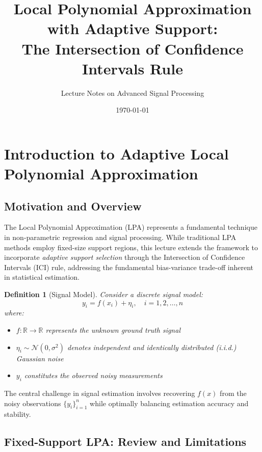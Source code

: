 \documentclass[12pt]{article}
\title{Local Polynomial Approximation with Adaptive Support: \\ The Intersection of Confidence Intervals Rule}
\author{Lecture Notes on Advanced Signal Processing}
\date{\today}
\newcommand{\R}{\mathbb{R}}
\newtheorem{definition}[theorem]{Definition}
\begin{document}
\maketitle
\tableofcontents

\newpage

\section{Introduction to Adaptive Local Polynomial Approximation}

\subsection{Motivation and Overview}

The Local Polynomial Approximation (LPA) represents a fundamental technique in non-parametric regression and signal processing. While traditional LPA methods employ fixed-size support regions, this lecture extends the framework to incorporate \textit{adaptive support selection} through the Intersection of Confidence Intervals (ICI) rule, addressing the fundamental bias-variance trade-off inherent in statistical estimation.

\begin{definition}[Signal Model]
    Consider a discrete signal model:
    \begin{equation}
        y_i = f(x_i) + \eta_i, \quad i = 1, 2, \ldots, n
        \label{eq:signal_model}
    \end{equation}
    where:
    \begin{itemize}
        \item $f: \R \to \R$ represents the unknown ground truth signal
        \item $\eta_i \sim \mathcal{N}(0, \sigma^2)$ denotes independent and identically distributed (i.i.d.) Gaussian noise
        \item $y_i$ constitutes the observed noisy measurements
    \end{itemize}
\end{definition}

The central challenge in signal estimation involves recovering $f(x)$ from the noisy observations $\{y_i\}_{i=1}^n$ while optimally balancing estimation accuracy and stability.

\subsection{Fixed-Support LPA: Review and Limitations}
\end{document}
